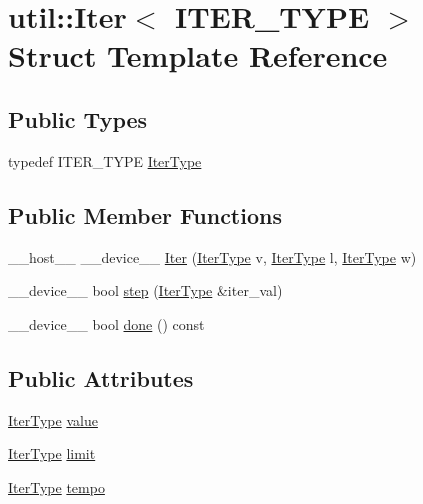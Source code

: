 \hypertarget{structutil_1_1Iter}{\section{util\-:\-:Iter$<$ I\-T\-E\-R\-\_\-\-T\-Y\-P\-E $>$ Struct Template Reference}
\label{structutil_1_1Iter}
}
\subsection*{Public Types}
\begin{DoxyCompactItemize}
\item 
typedef I\-T\-E\-R\-\_\-\-T\-Y\-P\-E \hyperlink{structutil_1_1Iter_a696147d8ea10fa472bd0184a20c027c9}{Iter\-Type}
\end{DoxyCompactItemize}
\subsection*{Public Member Functions}
\begin{DoxyCompactItemize}
\item 
\-\_\-\-\_\-host\-\_\-\-\_\- \-\_\-\-\_\-device\-\_\-\-\_\- \hyperlink{structutil_1_1Iter_ad40ed6129d723ee1bdb9a8d8e141f120}{Iter} (\hyperlink{structutil_1_1Iter_a696147d8ea10fa472bd0184a20c027c9}{Iter\-Type} v, \hyperlink{structutil_1_1Iter_a696147d8ea10fa472bd0184a20c027c9}{Iter\-Type} l, \hyperlink{structutil_1_1Iter_a696147d8ea10fa472bd0184a20c027c9}{Iter\-Type} w)
\item 
\-\_\-\-\_\-device\-\_\-\-\_\- bool \hyperlink{structutil_1_1Iter_ac03ef46a7c4bbca21767068af73ca62a}{step} (\hyperlink{structutil_1_1Iter_a696147d8ea10fa472bd0184a20c027c9}{Iter\-Type} \&iter\-\_\-val)
\item 
\-\_\-\-\_\-device\-\_\-\-\_\- bool \hyperlink{structutil_1_1Iter_af3a574ab7f1dbffa38d9c942437fbf11}{done} () const 
\end{DoxyCompactItemize}
\subsection*{Public Attributes}
\begin{DoxyCompactItemize}
\item 
\hyperlink{structutil_1_1Iter_a696147d8ea10fa472bd0184a20c027c9}{Iter\-Type} \hyperlink{structutil_1_1Iter_ac926295bb2bf847130bccf974259a8e6}{value}
\item 
\hyperlink{structutil_1_1Iter_a696147d8ea10fa472bd0184a20c027c9}{Iter\-Type} \hyperlink{structutil_1_1Iter_adbc6052a7353abb1e4c199b691cd9170}{limit}
\item 
\hyperlink{structutil_1_1Iter_a696147d8ea10fa472bd0184a20c027c9}{Iter\-Type} \hyperlink{structutil_1_1Iter_a19fa35c05914484d2330667c5d9f26e4}{tempo}
\end{DoxyCompactItemize}


